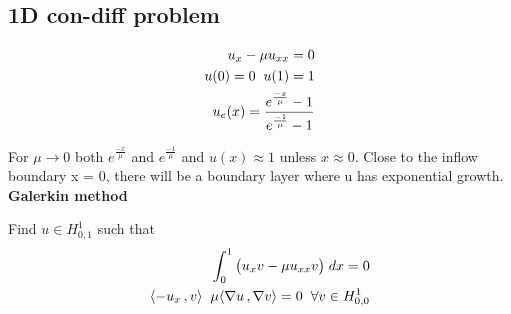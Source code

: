 \documentclass[a4paper,norsk]{article}
\begin{document}
\newpage
\subsection{1D con-diff problem}
\begin{align*}
\ u_x - \mu u_{xx}  = 0 \\
u(0) = 0 \hspace{2mm} u(1) = 1 \\
u_e(x) = \frac{e^{\frac{-x}{\mu}} -1}{e^{\frac{-1}{\mu}} - 1}
\end{align*}

For $\mu \rightarrow 0$ both $e^{\frac{-x}{\mu}}$ and $e^{\frac{-1}{\mu}}$ and $u(x) \approx 1$ unless $x \approx 0$. Close to the inflow boundary
x = 0, there will be a boundary layer where u has exponential growth.
\newline \textbf{Galerkin method} \newline

Find $u \in  H^1_{0,1}$ such that 
\begin{align*}
\int_0^1 \big( u_x v - \mu u_{xx} v \big) \hspace{1mm} dx = 0 \\
\inner[-u_x]{v} \hspace{2mm} \mu \inner[\nabla u]{\nabla v} = 0 \hspace{2mm}  \forall v \in H^1_{0,0}
\end{align*}
\end{document}
